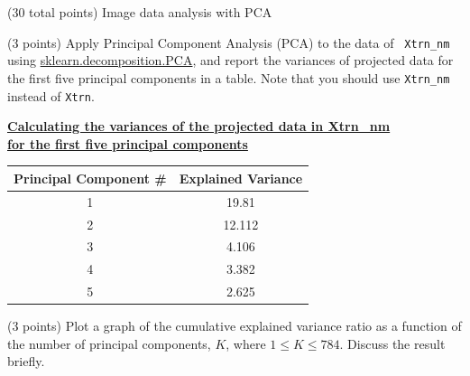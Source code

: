 \documentclass[12pt]{article}
\begin{document}
\begin{question}{(30 total points) Image data analysis with PCA}
\begin{subquestion}
   \end{subquestion}

   \begin{subquestion}{(3 points)
       Apply Principal Component Analysis (PCA) to the data of {\tt
         Xtrn\_nm} using \href{https://scikit-learn.org/0.19/modules/generated/sklearn.decomposition.PCA.html}{sklearn.decomposition.PCA}, and report the variances of projected data for the first five principal components in a table.
        Note that you should use {\tt Xtrn\_nm} instead of {\tt Xtrn}.
     } \label{Q1.pca.variance}



    \begin{answerbox}{15em}
        \begin{center}
        \textbf{\large{\underline{Calculating the variances of the projected data in Xtrn\_nm}}}\\
        \textbf{\large{\underline{for the first five principal components}}}\\
        \vspace{0.5cm}
        \begin{tabular}{ |c|c| } \hline
        \textbf{Principal Component \#} & \textbf{Explained Variance} \\ \hline
        1 & 19.81 \\
        2 & 12.112 \\
        3 & 4.106 \\
        4 & 3.382 \\
        5 & 2.625 \\\hline
        \end{tabular}
        \end{center}
    \end{answerbox}
    


   \end{subquestion}

   \begin{subquestion}{(3 points)
       Plot a graph of the cumulative explained variance ratio as a function of the number of principal components, $K$, where $1\le K \le 784$.
       Discuss the result briefly.
     } \label{Q1.plot.pca.variance}
   


\end{subquestion}
\end{question}
\end{document}
